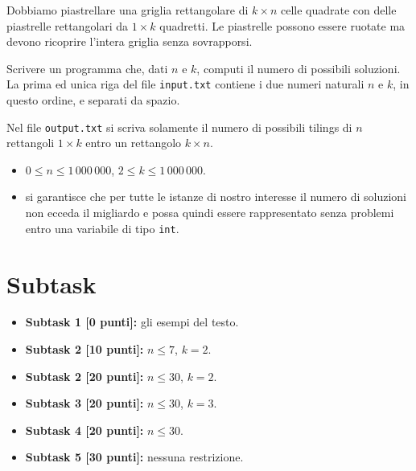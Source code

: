 \renewcommand{\nomebreve}{piastrelle1xk}
\renewcommand{\titolo}{Piastrelle da uno per kappa}

\introduzione{}

Dobbiamo piastrellare una griglia rettangolare di $k\times n$ celle quadrate
con delle piastrelle rettangolari da $1\times k$ quadretti. Le piastrelle possono essere ruotate ma devono ricoprire l'intera griglia senza sovrapporsi. 

Scrivere un programma che, dati $n$ e $k$, computi il numero di possibili soluzioni.\\


La prima ed unica riga del file \verb'input.txt' contiene i due numeri naturali $n$ e $k$, in questo ordine, e separati da spazio.

Nel file \verb'output.txt' si scriva solamente il numero di possibili tilings
di $n$ rettangoli $1\times k$ entro un rettangolo $k\times n$.\\




\begin{itemize}[nolistsep, noitemsep]
  \item $0 \le n \le 1\,000\,000$, $2 \le k \le 1\,000\,000$.
  \item si garantisce che per tutte le istanze di nostro interesse il numero di soluzioni non ecceda il migliardo e possa quindi essere rappresentato senza problemi entro una variabile di tipo {\tt int}.  
\end{itemize}
  
  \section*{Subtask}
  \begin{itemize}
    \item \textbf{Subtask 1 [0 punti]:} gli esempi del testo.
    \item \textbf{Subtask 2 [10 punti]:} $n \leq 7$, $k=2$.
    \item \textbf{Subtask 2 [20 punti]:} $n \leq 30$, $k=2$.
    \item \textbf{Subtask 3 [20 punti]:} $n \leq 30$, $k=3$.
    \item \textbf{Subtask 4 [20 punti]:} $n \leq 30$.
    \item \textbf{Subtask 5 [30 punti]:} nessuna restrizione.
  \end{itemize}
  
